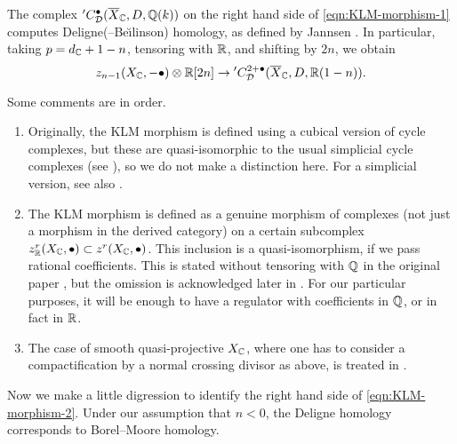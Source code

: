 \documentclass{article}
\numberwithin{equation}{section}
\begin{document}
The complex ${}' C_\mathcal{D}^{\bullet} (\overline{X}_{\mathbb{C}}, D, \mathbb{Q} (k))$ on the
right hand side of \eqref{eqn:KLM-morphism-1} computes Deligne(--Be\u{\i}linson)
homology, as defined by Jannsen \cite{Jannsen-1988}. In particular, taking
$p = d_{\mathbb{C}} + 1 - n$, tensoring with $\mathbb{R}$, and shifting by $2n$, we obtain
\begin{equation}
  \label{eqn:KLM-morphism-2}
  z_{n-1} (X_{\mathbb{C}}, -\bullet) \otimes \mathbb{R} [2n] \to
  {}' C_\mathcal{D}^{2 + \bullet} (\overline{X}_{\mathbb{C}}, D, \mathbb{R} (1-n)).
\end{equation}

\begin{remark}
  Some comments are in order.

  \begin{enumerate}
  \item Originally, the KLM morphism is defined using a cubical version of cycle
    complexes, but these are quasi-isomorphic to the usual simplicial cycle
    complexes (see \cite{Levine-1994}), so we do not make a distinction here.
    For a simplicial version, see also \cite{Kerr-Lewis-Lopatto-2018}.

  \item The KLM morphism is defined as a genuine morphism of complexes (not just
    a morphism in the derived category) on a certain subcomplex
    $z^r_{\mathbb{R}} (X_{\mathbb{C}}, \bullet) \subset z^r (X_{\mathbb{C}}, \bullet)$. This inclusion is a
    quasi-isomorphism, if we pass rational coefficients. This is stated without
    tensoring with $\mathbb{Q}$ in the original paper
    \cite{Kerr-Lewis-Muller-Stach-2006}, but the omission is acknowledged later
    in \cite{Kerr-Lewis-2007}. For our particular purposes, it will be enough to
    have a regulator with coefficients in $\mathbb{Q}$, or in fact in $\mathbb{R}$.

  \item The case of smooth quasi-projective $X_{\mathbb{C}}$, where one has to consider a
    compactification by a normal crossing divisor as above, is treated in
    \cite[\S 5.9]{Kerr-Lewis-Muller-Stach-2006}.
  \end{enumerate}
\end{remark}

Now we make a little digression to identify the right hand side of
\eqref{eqn:KLM-morphism-2}. Under our assumption that $n < 0$, the Deligne
homology corresponds to Borel--Moore homology.
\end{document}
